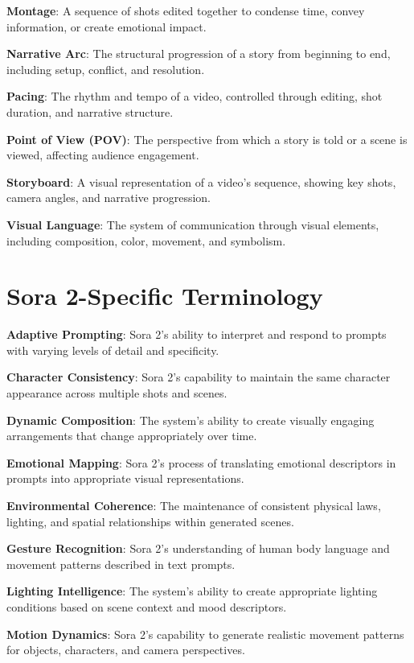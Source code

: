 \textbf{Montage}: A sequence of shots edited together to condense time, convey information, or create emotional impact.

\textbf{Narrative Arc}: The structural progression of a story from beginning to end, including setup, conflict, and resolution.

\textbf{Pacing}: The rhythm and tempo of a video, controlled through editing, shot duration, and narrative structure.

\textbf{Point of View (POV)}: The perspective from which a story is told or a scene is viewed, affecting audience engagement.

\textbf{Storyboard}: A visual representation of a video's sequence, showing key shots, camera angles, and narrative progression.

\textbf{Visual Language}: The system of communication through visual elements, including composition, color, movement, and symbolism.

\section{Sora 2-Specific Terminology}

\textbf{Adaptive Prompting}: Sora 2's ability to interpret and respond to prompts with varying levels of detail and specificity.

\textbf{Character Consistency}: Sora 2's capability to maintain the same character appearance across multiple shots and scenes.

\textbf{Dynamic Composition}: The system's ability to create visually engaging arrangements that change appropriately over time.

\textbf{Emotional Mapping}: Sora 2's process of translating emotional descriptors in prompts into appropriate visual representations.

\textbf{Environmental Coherence}: The maintenance of consistent physical laws, lighting, and spatial relationships within generated scenes.

\textbf{Gesture Recognition}: Sora 2's understanding of human body language and movement patterns described in text prompts.

\textbf{Lighting Intelligence}: The system's ability to create appropriate lighting conditions based on scene context and mood descriptors.

\textbf{Motion Dynamics}: Sora 2's capability to generate realistic movement patterns for objects, characters, and camera perspectives.

